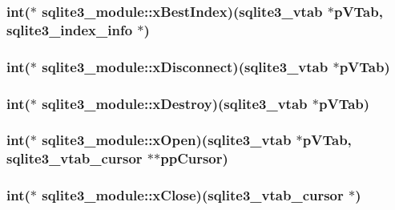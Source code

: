 \hypertarget{structsqlite3__module_66577e230ca8de525b30ee6f287eafb1}{
\subsubsection[xBestIndex]{\setlength{\rightskip}{0pt plus 5cm}int($\ast$ {\bf sqlite3\_\-module::xBestIndex})({\bf sqlite3\_\-vtab} $\ast$pVTab, {\bf sqlite3\_\-index\_\-info} $\ast$)}}
\label{structsqlite3__module_66577e230ca8de525b30ee6f287eafb1}


\hypertarget{structsqlite3__module_5dbaa6ff075eaff25ccfddaedba06934}{
\subsubsection[xDisconnect]{\setlength{\rightskip}{0pt plus 5cm}int($\ast$ {\bf sqlite3\_\-module::xDisconnect})({\bf sqlite3\_\-vtab} $\ast$pVTab)}}
\label{structsqlite3__module_5dbaa6ff075eaff25ccfddaedba06934}


\hypertarget{structsqlite3__module_296dae8dadd4eb1f7d0f1187650c7aa5}{
\subsubsection[xDestroy]{\setlength{\rightskip}{0pt plus 5cm}int($\ast$ {\bf sqlite3\_\-module::xDestroy})({\bf sqlite3\_\-vtab} $\ast$pVTab)}}
\label{structsqlite3__module_296dae8dadd4eb1f7d0f1187650c7aa5}


\hypertarget{structsqlite3__module_2cb9f8c149617189efa6ceec0a3211e9}{
\subsubsection[xOpen]{\setlength{\rightskip}{0pt plus 5cm}int($\ast$ {\bf sqlite3\_\-module::xOpen})({\bf sqlite3\_\-vtab} $\ast$pVTab, {\bf sqlite3\_\-vtab\_\-cursor} $\ast$$\ast$ppCursor)}}
\label{structsqlite3__module_2cb9f8c149617189efa6ceec0a3211e9}


\hypertarget{structsqlite3__module_514c66634a5297ca9879947fa6f8f10f}{
\subsubsection[xClose]{\setlength{\rightskip}{0pt plus 5cm}int($\ast$ {\bf sqlite3\_\-module::xClose})({\bf sqlite3\_\-vtab\_\-cursor} $\ast$)}}
\label{structsqlite3__module_514c66634a5297ca9879947fa6f8f10f}


